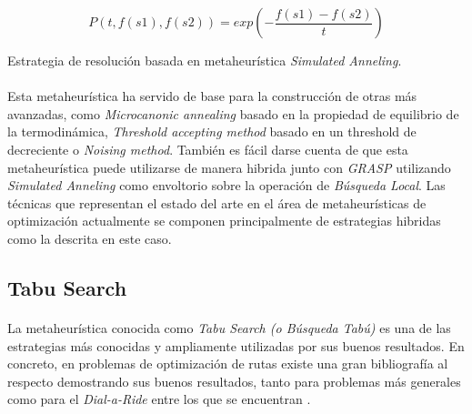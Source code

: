 \documentclass{subfiles}
\begin{document}
        \begin{equation}
          \label{eq:simulated_anneling}
          P(t, f(s1), f(s2)) = exp\left(-\frac{f(s1) - f(s2)}{t}\right)
        \end{equation}

        \begin{algorithm}[ht]
          \SetAlgoLined
          \caption{Estrategia de resolución basada en metaheurística \emph{Simulated Anneling}.}
          \label{code:solving_simulated_anneling}
        \end{algorithm}

        \paragraph{}
        Esta metaheurística ha servido de base para la construcción de otras más avanzadas, como \emph{Microcanonic annealing} basado en la propiedad de equilibrio de la termodinámica, \emph{Threshold accepting method} basado en un threshold de decreciente o \emph{Noising method}. También es fácil darse cuenta de que esta metaheurística puede utilizarse de manera hibrida junto con \emph{GRASP} utilizando \emph{Simulated Anneling} como envoltorio sobre la operación de \emph{Búsqueda Local}. Las técnicas que representan el estado del arte en el área de metaheurísticas de optimización actualmente se componen principalmente de estrategias hibridas como la descrita en este caso.

      \subsection{Tabu Search}
      \label{sec:solving_tabu}

        \paragraph{}
        La metaheurística conocida como \emph{Tabu Search (o Búsqueda Tabú)} es una de las estrategias más conocidas y ampliamente utilizadas por sus buenos resultados. En concreto, en problemas de optimización de rutas existe una gran bibliografía al respecto demostrando sus buenos resultados, tanto para problemas más generales como para el \emph{Dial-a-Ride} entre los que se encuentran \cite{gendreau1994tabu,cordeau2001unified,cordeau2003tabu}.
\end{document}
